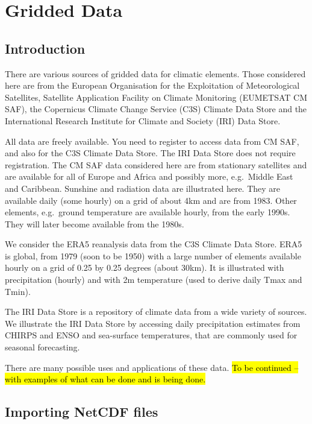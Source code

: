 \documentclass[
  letterpaper,
  DIV=11,
  numbers=noendperiod]{scrreprt}
\begin{document}

\chapter{Gridded Data}\label{gridded-data}

\section{Introduction}\label{introduction-7}

There are various sources of gridded data for climatic elements. Those
considered here are from the European Organisation for the Exploitation
of Meteorological Satellites, Satellite Application Facility on Climate
Monitoring (EUMETSAT CM SAF), the Copernicus Climate Change Service
(C3S) Climate Data Store and the International Research Institute for
Climate and Society (IRI) Data Store.

All data are freely available. You need to register to access data from
CM SAF, and also for the C3S Climate Data Store. The IRI Data Store does
not require registration. The CM SAF data considered here are from
stationary satellites and are available for all of Europe and Africa and
possibly more, e.g.~Middle East and Caribbean. Sunshine and radiation
data are illustrated here. They are available daily (some hourly) on a
grid of about 4km and are from 1983. Other elements, e.g.~ground
temperature are available hourly, from the early 1990s. They will later
become available from the 1980s.

We consider the ERA5 reanalysis data from the C3S Climate Data Store.
ERA5 is global, from 1979 (soon to be 1950) with a large number of
elements available hourly on a grid of 0.25 by 0.25 degrees (about
30km). It is illustrated with precipitation (hourly) and with 2m
temperature (used to derive daily Tmax and Tmin).

The IRI Data Store is a repository of climate data from a wide variety
of sources. We illustrate the IRI Data Store by accessing daily
precipitation estimates from CHIRPS and ENSO and sea-surface
temperatures, that are commonly used for seasonal forecasting.

There are many possible uses and applications of these data. \hl{To be
continued -- with examples of what can be done and is being done.}

\section{Importing NetCDF files}\label{importing-netcdf-files}
\end{document}
